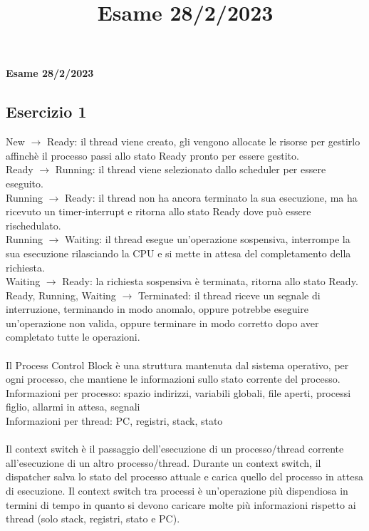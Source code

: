 \documentclass[12pt]{article}
\title{Esame 28/2/2023}
\begin{document}
\begin{center}
    \large\textbf{Esame 28/2/2023}
\end{center}
\subsection*{Esercizio 1}
New $\rightarrow$ Ready: il thread viene creato, gli vengono allocate le risorse per gestirlo affinchè il processo passi 
allo stato Ready pronto per essere gestito.\\
Ready $\rightarrow$ Running: il thread viene selezionato dallo scheduler per essere eseguito.\\
Running $\rightarrow$ Ready: il thread non ha ancora terminato la sua esecuzione, ma ha ricevuto un timer-interrupt e 
ritorna allo stato Ready dove può essere rischedulato.\\
Running $\rightarrow$ Waiting: il thread esegue un'operazione sospensiva, interrompe la sua esecuzione rilasciando la CPU 
e si mette in attesa del completamento della richiesta.\\
Waiting $\rightarrow$ Ready: la richiesta sospensiva è terminata, ritorna allo stato Ready.\\
Ready, Running, Waiting $\rightarrow$ Terminated: il thread riceve un segnale di interruzione, terminando in modo anomalo, 
oppure potrebbe eseguire un'operazione non valida, oppure terminare in modo corretto dopo aver completato tutte le operazioni.\\\\
Il Process Control Block è una struttura mantenuta dal sistema operativo, per ogni processo, che mantiene le informazioni 
sullo stato corrente del processo.\\
Informazioni per processo: spazio indirizzi, variabili globali, file aperti, processi figlio, allarmi in attesa, segnali\\
Informazioni per thread: PC, registri, stack, stato\\\\  
Il context switch è il passaggio dell'esecuzione di un processo/thread corrente all'esecuzione di un altro processo/thread. 
Durante un context switch, il dispatcher salva lo stato del processo attuale e carica quello del processo in attesa di 
esecuzione. Il context switch tra processi è un'operazione più dispendiosa in termini di tempo in quanto si devono caricare 
molte più informazioni rispetto ai thread (solo stack, registri, stato e PC).
\end{document}

